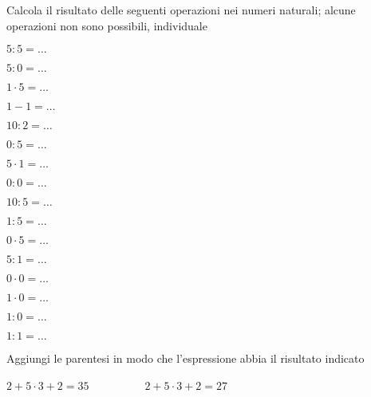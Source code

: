\begin{esercizio}
Calcola il risultato delle seguenti operazioni nei numeri naturali; 
alcune operazioni non sono possibili, individuale
 \begin{htmulticols}{4}
 \begin{enumeratees}
 \item \(5:5=\ldots\)
 \item \(5:0=\ldots\)
 \item \(1\cdot 5 =\ldots\)
 \item \(1-1=\ldots\)
 \item \(10:2=\ldots\)
 \item \(0:5=\ldots\)
 \item \(5\cdot1=\ldots\)
 \item \(0:0=\ldots\)
 \item \(10:5=\ldots\)
 \item \(1:5=\ldots\)
 \item \(0\cdot5=\ldots\)
 \item \(5:1=\ldots\)
 \item \(0\cdot0=\ldots\)
 \item \(1\cdot0=\ldots\)
 \item \(1:0=\ldots\)
 \item \(1:1=\ldots\)
 \end{enumeratees}
 \end{htmulticols}
\end{esercizio}


\begin{esercizio}
Aggiungi le parentesi in modo che l'espressione abbia il risultato indicato

\(2+5\cdot3+2=35\) ~~~~ \hspace{30mm} ~~~~ \(2+5\cdot3+2=27\)
\end{esercizio}

